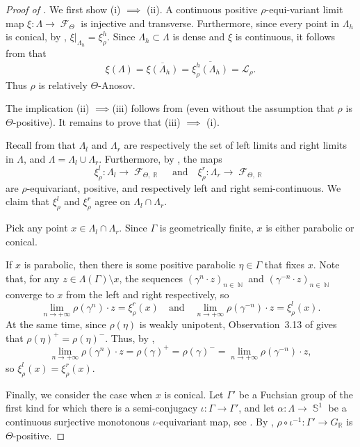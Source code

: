 \documentclass{amsart}
\theoremstyle{plain}
\theoremstyle{definition}
\DeclareMathOperator{\Fc}{\mathcal{F}}
\DeclareMathOperator{\Nb}{{\mathbb{N}}}
\DeclareMathOperator{\Rb}{{\mathbb{R}}}
\DeclareMathOperator{\Sb}{\mathbb{S}}
\newcommand{\1}{\mathbf{1}}
\begin{document}
\begin{proof}[Proof of ]
    We first show (i) $\implies$ (ii).
    A continuous positive $\rho$-equi-variant limit map $\xi \colon \Lambda\to \Fc_\Theta$ is injective and transverse. Furthermore, since every point in $\Lambda_h$ is conical, by , $\xi|_{\Lambda_h}=\xi_\rho^h$. Since $\Lambda_h\subset\Lambda$ is dense and $\xi$ is continuous, it follows from  that 
    \[\xi(\Lambda)=\overline{\xi(\Lambda_h)}=\overline{\xi_\rho^h(\Lambda_h)}=\mathcal L_\rho.\]
    Thus $\rho$ is relatively $\Theta$-Anosov.
    
    The implication (ii) $\implies$(iii) follows from \cite{ZZ1} (even without the assumption that $\rho$ is $\Theta$-positive). It remains to prove that (iii) $\implies$ (i).

    Recall from  that $\Lambda_l$ and $\Lambda_r$ are respectively the set of left limits and right limits in $\Lambda$, and $\Lambda=\Lambda_l\cup\Lambda_r$. Furthermore, by , the maps 
    \[\xi_\rho^l:\Lambda_l\to\Fc_{\Theta,\Rb}\quad\text{and}\quad\xi_\rho^r:\Lambda_r\to\Fc_{\Theta,\Rb}\] 
    are $\rho$-equivariant, positive, and respectively left and right semi-continuous. We claim that $\xi_\rho^l$ and $\xi_\rho^r$ agree on $\Lambda_l\cap\Lambda_r$.

    Pick any point $x\in\Lambda_l\cap\Lambda_r$. Since $\Gamma$ is geometrically finite, $x$ is either parabolic or conical. 
    
    If $x$ is parabolic, then there is some positive parabolic $\eta\in\Gamma$ that fixes $x$. Note that, for any $z\in\Lambda(\Gamma)\setminus x$, the sequences $(\gamma^n\cdot z)_{n\in\Nb}$ and $(\gamma^{-n}\cdot z)_{n\in\Nb}$ converge to $x$ from the left and right respectively, so 
    \[\lim_{n\to+\infty}\rho(\gamma^n)\cdot z=\xi_\rho^r(x)\quad\text{and}\quad\lim_{n\to+\infty}\rho(\gamma^{-n})\cdot z=\xi_\rho^l(x).\]
    At the same time, since $\rho(\eta)$ is weakly unipotent, Observation~3.13 of \cite{ZZ1} gives that $\rho(\eta)^+=\rho(\eta)^-$. Thus, by ,
    \[\lim_{n\to+\infty}\rho(\gamma^n)\cdot z=\rho(\gamma)^+=\rho(\gamma)^-=\lim_{n\to+\infty}\rho(\gamma^{-n})\cdot z,\]
    so $\xi_\rho^l(x)=\xi_\rho^r(x)$.

    Finally, we consider the case when $x$ is conical. Let $\Gamma'$ be a Fuchsian group of the first kind for which there is a semi-conjugacy $\iota \colon \Gamma \to \Gamma'$, and let $\alpha\colon \Lambda\to \Sb^1$ be a continuous surjective monotonous $\iota$-equivariant map, see . By , $\rho\circ\iota^{-1}\colon  \Gamma' \to G_{\Rb}$ is $\Theta$-positive. 
    

\end{proof}
\end{document}
